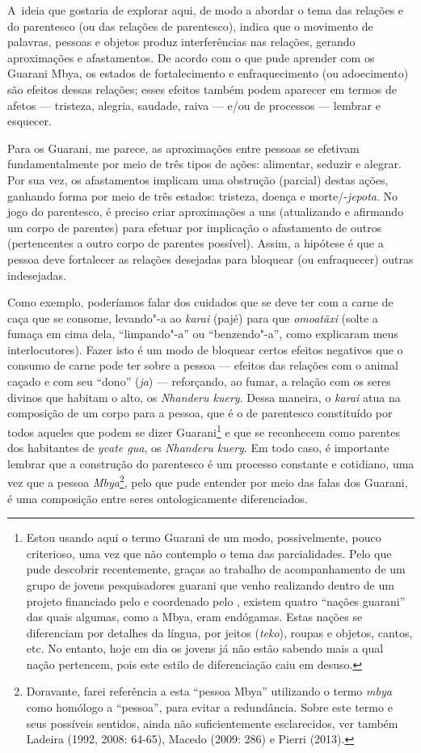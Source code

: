 A~ideia que gostaria de explorar aqui, de modo a abordar o tema das
relações e do parentesco (ou das relações de parentesco), indica que o
movimento de palavras, pessoas e objetos produz interferências nas
relações, gerando aproximações e afastamentos. De acordo com o que pude
aprender com os Guarani Mbya, os estados de fortalecimento e
enfraquecimento (ou adoecimento) são efeitos dessas relações; esses
efeitos também podem aparecer em termos de afetos --- tristeza, alegria,
saudade, raiva --- e/ou de processos --- lembrar e esquecer.

Para os Guarani, me parece, as aproximações entre pessoas se efetivam
fundamentalmente por meio de três tipos de ações: alimentar, seduzir e
alegrar. Por sua vez, os afastamentos implicam uma obstrução (parcial)
destas ações, ganhando forma por meio de três estados: tristeza, doença
e morte/-\emph{jepota}. No jogo do parentesco, é preciso criar aproximações a
uns (atualizando e afirmando um corpo de parentes) para efetuar por
implicação o afastamento de outros (pertencentes a outro corpo de
parentes possível). Assim, a hipótese é que a pessoa deve fortalecer as
relações desejadas para bloquear (ou enfraquecer) outras indesejadas.

Como exemplo, poderíamos falar dos cuidados que se deve ter com a carne
de caça que se consome, levando"-a ao \emph{karai} (pajé) para que \emph{omoatãxi}
(solte a fumaça em cima dela, ``limpando"-a'' ou ``benzendo"-a'', como
explicaram meus interlocutores). Fazer isto é um modo de bloquear
certos efeitos negativos que o consumo de carne pode ter sobre a pessoa
--- efeitos das relações com o animal caçado e com seu ``dono'' (\emph{ja}) ---
reforçando, ao fumar, a relação com os seres divinos que habitam o
alto, os \emph{Nhanderu kuery}. Dessa maneira, o \emph{karai} atua na composição de
um corpo para a pessoa, que é o de parentesco constituído por todos
aqueles que podem se dizer Guarani\footnote{Estou usando aqui o termo
Guarani de um modo, possivelmente, pouco criterioso, uma vez que não
contemplo o tema das parcialidades. Pelo que pude descobrir
recentemente, graças ao trabalho de acompanhamento de um grupo de
jovens pesquisadores guarani que venho realizando dentro de um projeto
financiado pelo  e coordenado pelo , existem quatro ``nações
guarani'' das quais algumas, como a Mbya, eram endógamas. Estas nações
se diferenciam por detalhes da língua, por jeitos (\emph{teko}), roupas e
objetos, cantos, etc. No entanto, hoje em dia os jovens já não estão
sabendo mais a qual nação pertencem, pois este estilo de diferenciação
caiu em desuso.} e que se reconhecem como parentes dos habitantes de
\emph{yvate gua}, os \emph{Nhanderu kuery}. Em todo caso, é importante lembrar que a
construção do parentesco é um processo constante e cotidiano, uma vez
que a pessoa \emph{Mbya}\footnote{Doravante, farei referência a esta ``pessoa
Mbya'' utilizando o termo \emph{mbya} como homólogo a ``pessoa'', para evitar a
redundância. Sobre este termo e seus possíveis sentidos, ainda não
suficientemente esclarecidos, ver também Ladeira (1992, 2008: 64-65),
Macedo (2009: 286) e Pierri (2013).}, pelo que pude entender por meio
das falas dos Guarani, é uma composição entre seres ontologicamente
diferenciados.

